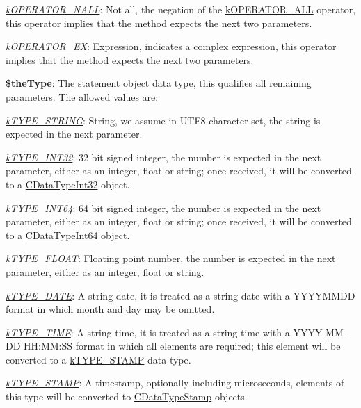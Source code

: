 \begin{DoxyItemize}
\begin{DoxyItemize}
\item {\itshape \hyperlink{}{k\-O\-P\-E\-R\-A\-T\-O\-R\-\_\-\-N\-A\-L\-L}}\-: Not all, the negation of the \hyperlink{}{k\-O\-P\-E\-R\-A\-T\-O\-R\-\_\-\-A\-L\-L} operator, this operator implies that the method expects the next two parameters. 
\item {\itshape \hyperlink{}{k\-O\-P\-E\-R\-A\-T\-O\-R\-\_\-\-E\-X}}\-: Expression, indicates a complex expression, this operator implies that the method expects the next two parameters. 
\end{DoxyItemize}
\item {\bfseries \$the\-Type}\-: The statement object data type, this qualifies all remaining parameters. The allowed values are\-: 
\begin{DoxyItemize}
\item {\itshape \hyperlink{}{k\-T\-Y\-P\-E\-\_\-\-S\-T\-R\-I\-N\-G}}\-: String, we assume in U\-T\-F8 character set, the string is expected in the next parameter. 
\item {\itshape \hyperlink{}{k\-T\-Y\-P\-E\-\_\-\-I\-N\-T32}}\-: 32 bit signed integer, the number is expected in the next parameter, either as an integer, float or string; once received, it will be converted to a \hyperlink{class_c_data_type_int32}{C\-Data\-Type\-Int32} object. 
\item {\itshape \hyperlink{}{k\-T\-Y\-P\-E\-\_\-\-I\-N\-T64}}\-: 64 bit signed integer, the number is expected in the next parameter, either as an integer, float or string; once received, it will be converted to a \hyperlink{class_c_data_type_int64}{C\-Data\-Type\-Int64} object. 
\item {\itshape \hyperlink{}{k\-T\-Y\-P\-E\-\_\-\-F\-L\-O\-A\-T}}\-: Floating point number, the number is expected in the next parameter, either as an integer, float or string. 
\item {\itshape \hyperlink{}{k\-T\-Y\-P\-E\-\_\-\-D\-A\-T\-E}}\-: A string date, it is treated as a string date with a Y\-Y\-Y\-Y\-M\-M\-D\-D format in which month and day may be omitted. 
\item {\itshape \hyperlink{}{k\-T\-Y\-P\-E\-\_\-\-T\-I\-M\-E}}\-: A string time, it is treated as a string time with a Y\-Y\-Y\-Y-\/\-M\-M-\/\-D\-D H\-H\-:\-M\-M\-:S\-S format in which all elements are required; this element will be converted to a \hyperlink{}{k\-T\-Y\-P\-E\-\_\-\-S\-T\-A\-M\-P} data type. 
\item {\itshape \hyperlink{}{k\-T\-Y\-P\-E\-\_\-\-S\-T\-A\-M\-P}}\-: A timestamp, optionally including microseconds, elements of this type will be converted to \hyperlink{class_c_data_type_stamp}{C\-Data\-Type\-Stamp} objects. 

\end{DoxyItemize}
\end{DoxyItemize}
